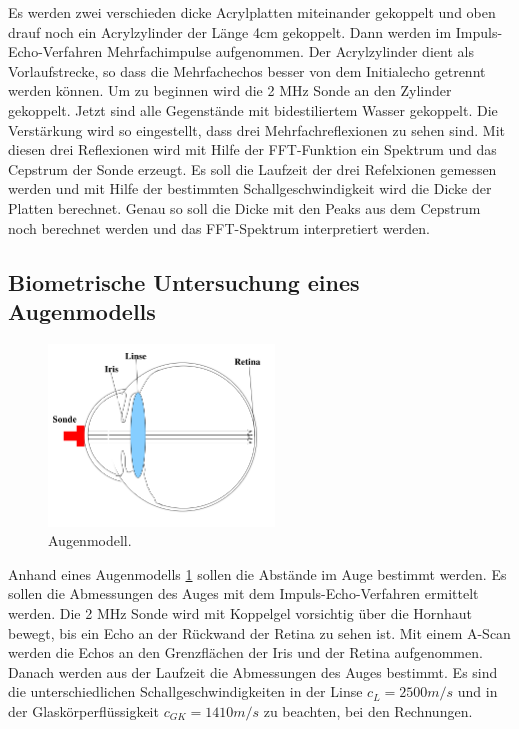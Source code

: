 Es werden zwei verschieden dicke Acrylplatten miteinander gekoppelt und oben drauf noch ein Acrylzylinder der Länge 4cm gekoppelt.
Dann werden im Impuls-Echo-Verfahren Mehrfachimpulse aufgenommen.
Der Acrylzylinder dient als Vorlaufstrecke, so dass die Mehrfachechos besser von dem Initialecho getrennt werden können.
Um zu beginnen wird die 2 MHz Sonde an den Zylinder gekoppelt.
Jetzt sind alle Gegenstände mit bidestiliertem Wasser gekoppelt.
Die Verstärkung wird so eingestellt, dass drei Mehrfachreflexionen zu sehen sind.
Mit diesen drei Reflexionen wird mit Hilfe der FFT-Funktion ein Spektrum und das Cepstrum der Sonde erzeugt.
Es soll die Laufzeit der drei Refelxionen gemessen werden und mit Hilfe der bestimmten Schallgeschwindigkeit wird die Dicke der Platten berechnet.
Genau so soll die Dicke mit den Peaks aus dem Cepstrum noch berechnet werden und das FFT-Spektrum interpretiert werden.

\subsection{Biometrische Untersuchung eines Augenmodells}
\label{sec:auge}

\begin{figure}
    \centering
    \includegraphics[width=6cm]{data/abb1.png}
    \caption{Augenmodell. \cite{US1}}
    \label{fig:modell}
  \end{figure}
  \FloatBarrier

Anhand eines Augenmodells \ref{fig:modell} sollen die Abstände im Auge bestimmt werden.
Es sollen die Abmessungen des Auges mit dem Impuls-Echo-Verfahren ermittelt werden.
Die 2 MHz Sonde wird mit Koppelgel vorsichtig über die Hornhaut bewegt, bis ein Echo an der Rückwand der Retina zu sehen ist.
Mit einem A-Scan werden die Echos an den Grenzflächen der Iris und der Retina aufgenommen.
Danach werden aus der Laufzeit die Abmessungen des Auges bestimmt.
Es sind die unterschiedlichen Schallgeschwindigkeiten in der Linse $c_L = 2500 m/s$ und in der Glaskörperflüssigkeit $c_{GK} = 1410 m/s$ zu beachten, bei den Rechnungen.
